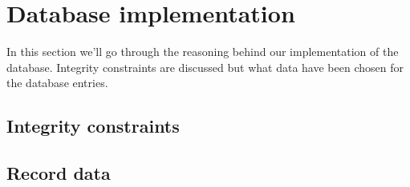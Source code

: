 \section{Database implementation}
In this section we'll go through the reasoning behind our implementation of the database. 
Integrity constraints are discussed but what data have been chosen for the database entries.
\subsection{Integrity constraints}
\subsection{Record data}
